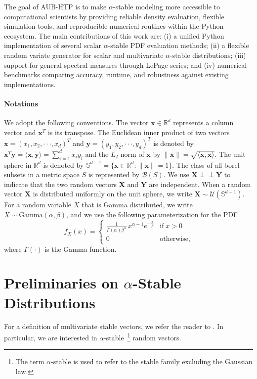 The goal of AUB-HTP is to make $\alpha$-stable modeling more accessible to computational scientists by providing reliable density evaluation, flexible simulation tools, and reproducible numerical routines within the Python ecosystem. The main contributions of this work are: (i) a unified Python implementation of several scalar $\alpha$-stable PDF evaluation methods; (ii) a flexible random variate generator for scalar and multivariate $\alpha$-stable distributions; (iii) support for general spectral measures through LePage series; and (iv) numerical benchmarks comparing accuracy, runtime, and robustness against existing implementations.

\paragraph*{Notations}
\label{sect:notations}
We adopt the following conventions. The vector $\mathbf{x}\in\mathbb{R}^d$ represents a column vector and $\mathbf{x}^T$ is its transpose. The Euclidean inner product of two vectors  $\mathbf{x} = (x_1,x_2,\cdot\cdot\cdot,x_d)^T$ and $\mathbf{y} = (y_1,y_2,\cdot\cdot\cdot,y_d)^T$ is denoted by $\mathbf{x}^T\mathbf{y}=⟨\mathbf{x},\mathbf{y}⟩=\sum_{i=1}^{d}x_iy_i $ and the $L_2$ norm of $\mathbf{x}$ by $\|\mathbf{x}\|=\sqrt{⟨\mathbf{x},\mathbf{x}⟩}$. The unit sphere in $\mathbb{R}^d$ is denoted by $\mathbb{S}^{d-1}=\{\mathbf{x}\in\mathbb{R}^d: \|\mathbf{x}\|=1\}$. The class of all borel subsets in a metric space $S$ is represented by $\mathcal{B}(S)$. We use $\mathbf{X} \perp\!\!\!\perp \mathbf{Y}$ to indicate that the two random vectors $\mathbf{X}$ and $\mathbf{Y}$ are independent. When a random vector $\mathbf{X}$ is distributed uniformly on the unit sphere, we write $\mathbf{X}\sim\mathcal{U}(\mathbb{S}^{d-1})$. For a random variable $X$ that is Gamma distributed, we write $X\sim\text{Gamma}(\alpha,\beta)$, and we use the following parameterization for the PDF \begin{equation*}
    f_{X}(x)=\begin{cases}
        \displaystyle \frac{1}{\Gamma(\alpha)\beta^{\alpha}} \, x^{\alpha-1} e^{-\frac{x}{\beta}} & \text{if}\; x>0\\
        0 & \text{otherwise},
    \end{cases}
\end{equation*}
where $\Gamma(\cdot)$ is the Gamma function.

\section{Preliminaries on $\alpha$-Stable Distributions}
For a definition of multivariate stable vectors, we refer the reader to \cite[Definition 2.1.1]{SamorodnitskyGennady2000Snrp}. In particular, we are interested in $\alpha$-stable~\footnote{The term $\alpha$-stable is used to refer to the stable family excluding the Gaussian law.} random vectors.

